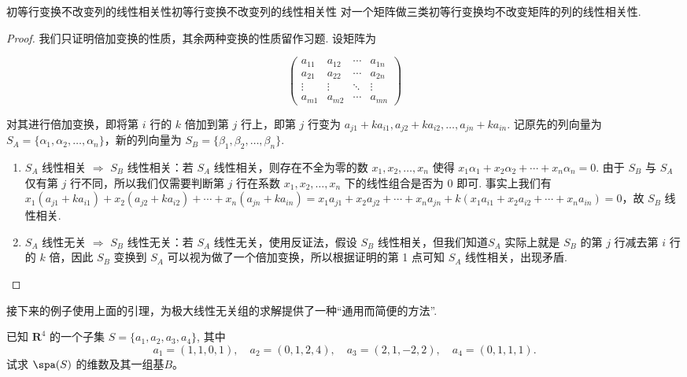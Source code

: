 \begin{lemma}{初等行变换不改变列的线性相关性}{初等行变换不改变列的线性相关性}
    对一个矩阵做三类初等行变换均不改变矩阵的列的线性相关性.
\end{lemma}

\begin{proof}
    我们只证明倍加变换的性质，其余两种变换的性质留作习题. 设矩阵为

    \[\begin{pmatrix}
        a_{11} & a_{12} & \cdots & a_{1n} \\
        a_{21} & a_{22} & \cdots & a_{2n} \\
        \vdots & \vdots & \ddots & \vdots \\
        a_{m1} & a_{m2} & \cdots & a_{mn}
    \end{pmatrix}\]

    对其进行倍加变换，即将第 $i$ 行的 $k$ 倍加到第 $j$ 行上，即第 $j$ 行变为 $a_{j1} + ka_{i1}, a_{j2} + ka_{i2}, \ldots, a_{jn} + ka_{in}$. 记原先的列向量为 $S_A = \{\alpha_1, \alpha_2, \ldots, \alpha_n\}$，新的列向量为 $S_B = \{\beta_1, \beta_2, \ldots, \beta_n\}$.

    \begin{enumerate}
        \item $S_A$ 线性相关 $\Rightarrow$ $S_B$ 线性相关：若 $S_A$ 线性相关，则存在不全为零的数 $x_1, x_2, \ldots, x_n$ 使得 $x_1\alpha_1 + x_2\alpha_2 + \cdots + x_n\alpha_n = 0$. 由于 $S_B$ 与 $S_A$ 仅有第 $j$ 行不同，所以我们仅需要判断第 $j$ 行在系数 $x_1, x_2, \ldots, x_n$ 下的线性组合是否为 0 即可. 事实上我们有 $x_1(a_{j1} + ka_{i1}) + x_2(a_{j2} + ka_{i2}) + \cdots + x_n(a_{jn} + ka_{in}) = x_1a_{j1} + x_2a_{j2} + \cdots + x_na_{jn} + k(x_1a_{i1} + x_2a_{i2} + \cdots + x_na_{in}) = 0$，故 $S_B$ 线性相关.
        \item $S_A$ 线性无关 $\Rightarrow$ $S_B$ 线性无关：若 $S_A$ 线性无关，使用反证法，假设 $S_B$ 线性相关，但我们知道$S_A$ 实际上就是 $S_B$ 的第 $j$ 行减去第 $i$ 行的 $k$ 倍，因此 $S_B$ 变换到 $S_A$ 可以视为做了一个倍加变换，所以根据证明的第 1 点可知 $S_A$ 线性相关，出现矛盾.
    \end{enumerate}
\end{proof}

接下来的例子使用上面的引理，为极大线性无关组的求解提供了一种``通用而简便的方法''.

\begin{example}{}{}
    已知 $\mathbf{R}^4$ 的一个子集 $S = \{a_1, a_2, a_3, a_4\}$, 其中
    \[
    a_1 = (1,1,0,1), \quad a_2 = (0,1,2,4), \quad
    a_3 = (2,1,-2,2), \quad a_4 = (0,1,1,1).
    \]
    试求 $\spa(S)$ 的维数及其一组基$B$。
\end{example}

